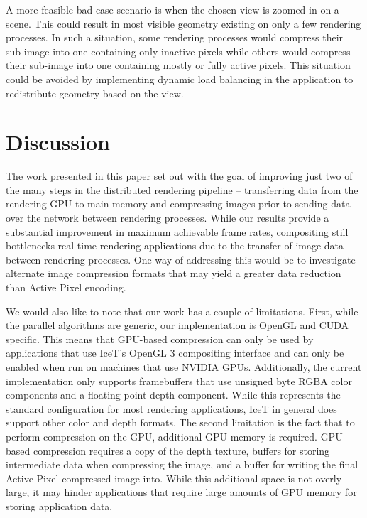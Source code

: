 \documentclass{vgtc}                          %
\begin{document}
A more feasible bad case scenario is when the chosen view is zoomed in on a scene. This could result in most visible geometry existing on only a few rendering processes. In such a situation, some rendering processes would compress their sub-image into one containing only inactive pixels while others would  compress their sub-image into one containing mostly or fully active pixels. This situation could be avoided by implementing dynamic load balancing in the application to redistribute geometry based on the view.


\section{Discussion}
The work presented in this paper set out with the goal of improving just two of the many steps in the distributed rendering pipeline -- transferring data from the rendering GPU to main memory and compressing images prior to sending data over the network between rendering processes. While our results provide a substantial improvement in maximum achievable frame rates, compositing still bottlenecks real-time rendering applications due to the transfer of image data between rendering processes. One way of addressing this would be to investigate alternate image compression formats that may yield a greater data reduction than Active Pixel encoding.

We would also like to note that our work has a couple of limitations. First, while the parallel algorithms are generic, our implementation is OpenGL and CUDA specific. This means that GPU-based compression can only be used by applications that use IceT's OpenGL 3 compositing interface and can only be enabled when run on machines that use NVIDIA GPUs. Additionally, the current implementation only supports framebuffers that use unsigned byte RGBA color components and a floating point depth component. While this represents the standard configuration for most rendering applications, IceT in general does support other color and depth formats. The second limitation is the fact that to perform compression on the GPU, additional GPU memory is required. GPU-based compression requires a copy of the depth texture, buffers for storing intermediate data when compressing the image, and a buffer for writing the final Active Pixel compressed image into. While this additional space is not overly large, it may hinder applications that require large amounts of GPU memory for storing application data.
\end{document}
